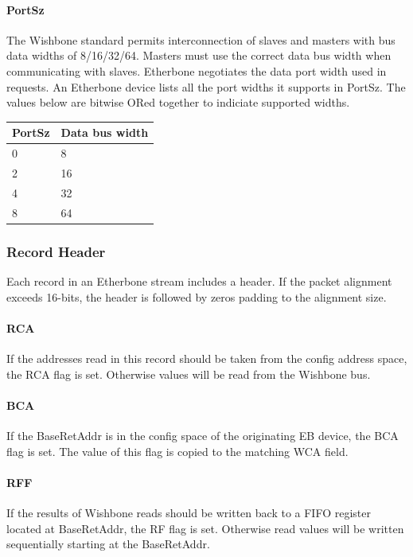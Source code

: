 \documentclass{article}
\begin{document}
\paragraph{PortSz} \label{field:PortSz}
The Wishbone standard permits interconnection of slaves and masters 
with bus data widths of 8/16/32/64.
Masters must use the correct data bus width when communicating with slaves.
Etherbone negotiates the data port width used in requests.
An Etherbone device lists all the port widths it supports in PortSz.
The values below are bitwise ORed together to indiciate supported widths.

\vspace{1em}
\begin{tabular}{|l|l|}
\hline
PortSz & Data bus width \\
\hline
0 & 8 \\
2 & 16 \\
4 & 32 \\
8 & 64 \\
\hline
\end{tabular}

\subsubsection{Record Header}

Each record in an Etherbone stream includes a header.
If the packet alignment exceeds 16-bits, 
the header is followed by zeros padding to the alignment size.

\paragraph{RCA} \label{field:RCA}
If the addresses read in this record should be taken from the config
address space, the RCA flag is set.
Otherwise values will be read from the Wishbone bus.

\paragraph{BCA} \label{field:BCA}
If the BaseRetAddr is in the config space of the originating EB device,
the BCA flag is set.
The value of this flag is copied to the matching WCA field.

\paragraph{RFF} \label{field:RFF}
If the results of Wishbone reads should be written back to a FIFO register
located at BaseRetAddr, the RF flag is set.
Otherwise read values will be written sequentially starting at the
BaseRetAddr.
\end{document}

